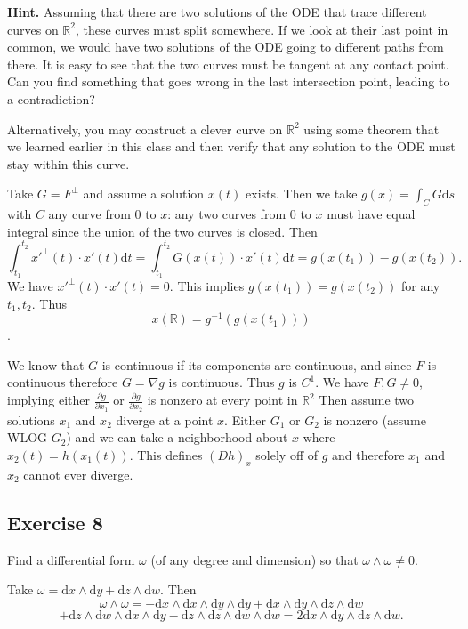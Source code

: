 \documentclass{amsart}
\newcommand{\R}{\mathbb R}
\newcommand{\dd}{\mathrm d}
\newcommand{\hint}{\noindent \textbf{Hint. }}
\begin{document}
\hint Assuming that there are two solutions of the ODE that trace different curves on $\R^2$, these curves must split somewhere. If we look at their last point in common, we would have two solutions of the ODE going to different paths from there. It is easy to see that the two curves must be tangent at any contact point. Can you find something that goes wrong in the last intersection point, leading to a contradiction?

\medskip \noindent Alternatively, you may construct a clever curve on $\R^2$ using some theorem that we learned earlier in this class and then verify that any solution to the ODE must stay within this curve.


\medskip \noindent Take $G=F^{\perp}$ and assume a solution $x(t)$ exists. Then we take $g(x)=\int_C G \dd s$ with $C$ any curve from $0$ to $x$:
any two curves from $0$ to $x$ must have equal integral since the union of the two curves is closed. Then
\[\int_{t_1}^{t_2}x'^{\perp}(t)\cdot x'(t)\dd t=\int_{t_1}^{t_2}G(x(t))\cdot x'(t)\dd t=g(x(t_1))-g(x(t_2)).\]
We have $x'^{\perp}(t)\cdot x'(t)=0$. This implies $g(x(t_1))=g(x(t_2))$ for any $t_1, t_2$. Thus
\[x(\mathbb{R})=g^{-1}(g(x(t_1)))\].

\medskip \noindent We know that $G$ is continuous if its components are continuous, and since $F$ is continuous therefore
$G = \nabla g$ is continuous. Thus $g$ is $C^1$. We have $F, G\neq 0$, implying either $\frac{\partial g}{\partial x_1}$ or
$\frac{\partial g}{\partial x_2}$ is nonzero at every point in $\mathbb{R}^2$ Then assume two solutions $x_1$ and $x_2$ diverge
at a point $x$. Either $G_1$ or $G_2$ is nonzero (assume WLOG $G_2$) and we can take a neighborhood about $x$ where $x_2(t) = h(x_1(t))$. 
This defines $(Dh)_x$ solely off of $g$ and therefore $x_1$ and $x_2$ cannot ever diverge.

\bigskip

\subsection*{Exercise 8} Find a differential form $\omega$ (of any degree and dimension) so that $\omega \wedge \omega \neq 0$.

\medskip \noindent Take $\omega = \dd x \wedge \dd y + \dd z \wedge \dd w$. Then 
\[\omega\wedge\omega=-\dd x\wedge\dd x\wedge\dd y\wedge\dd y + \dd x\wedge\dd y\wedge\dd z\wedge\dd w\]
\[+\dd z\wedge\dd w\wedge\dd x\wedge\dd y -\dd z\wedge\dd z\wedge\dd w\wedge\dd w=2\dd x\wedge\dd y\wedge\dd z\wedge\dd w.
\]
\end{document}
